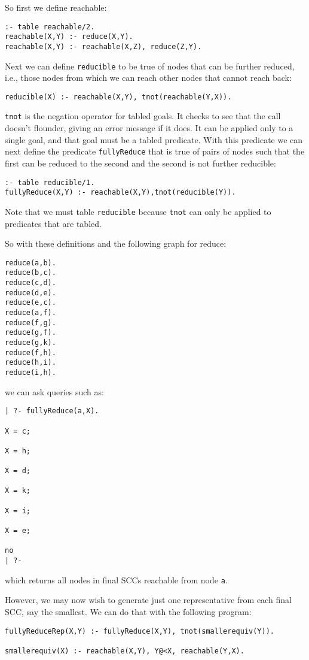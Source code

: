 So first we define reachable:
\begin{verbatim}
:- table reachable/2.
reachable(X,Y) :- reduce(X,Y).
reachable(X,Y) :- reachable(X,Z), reduce(Z,Y).
\end{verbatim}
Next we can define \verb|reducible| to be true of nodes that can be
further reduced, i.e., those nodes from which we can reach other nodes
that cannot reach back:
\begin{verbatim}
reducible(X) :- reachable(X,Y), tnot(reachable(Y,X)).
\end{verbatim}
\verb|tnot| is the negation operator for tabled goals.  It checks to 
see that the call doesn't flounder, giving an error message if it
does.  It can be applied only to a single goal, and that goal must be
a tabled predicate.  With this predicate we can next define the
predicate \verb|fullyReduce| that is true of pairs of nodes such that
the first can be reduced to the second and the second is not further
reducible:
\begin{verbatim}
:- table reducible/1.
fullyReduce(X,Y) :- reachable(X,Y),tnot(reducible(Y)).
\end{verbatim}
Note that we must table \verb|reducible| because \verb|tnot| can only
be applied to predicates that are tabled.

So with these definitions and the following graph for reduce:
\begin{verbatim}
reduce(a,b).
reduce(b,c).
reduce(c,d).
reduce(d,e).
reduce(e,c).
reduce(a,f).
reduce(f,g).
reduce(g,f).
reduce(g,k).
reduce(f,h).
reduce(h,i).
reduce(i,h).
\end{verbatim}
we can ask queries such as:
\begin{verbatim}
| ?- fullyReduce(a,X).

X = c;

X = h;

X = d;

X = k;

X = i;

X = e;

no
| ?- 
\end{verbatim}
which returns all nodes in final SCCs reachable from node \verb|a|.

However, we may now wish to generate just one representative from each
final SCC, say the smallest.  We can do that with the following
program:
\begin{verbatim}
fullyReduceRep(X,Y) :- fullyReduce(X,Y), tnot(smallerequiv(Y)).

smallerequiv(X) :- reachable(X,Y), Y@<X, reachable(Y,X).
\end{verbatim}

